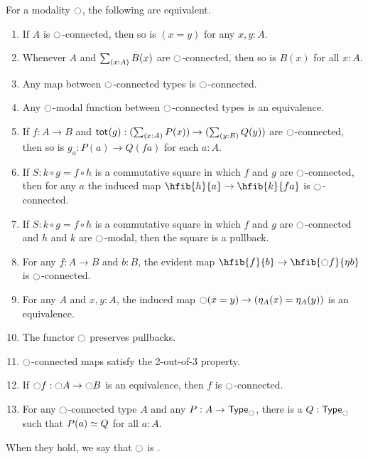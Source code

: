 \begin{thm}\label{thm:lex-modalities}
  For a modality $\modal$, the following are equivalent.
  \begin{enumerate}
  \item If $A$ is $\modal$-connected, then so is $(x=y)$ for any $x,y:A$.\label{item:mu0}
  \item Whenever $A$ and $\sm{x:A}B(x)$ are $\modal$-connected, then so is $B(x)$ for all $x:A$.\label{item:mu1}
  \item Any map between $\modal$-connected types is $\modal$-connected.\label{item:mu1a}
  \item Any $\modal$-modal function between $\modal$-connected types is an equivalence.\label{item:mu1b}
  \item If $f:A\to B$ and $\total g:(\sm{x:A} P(x)) \to (\sm{y:B} Q(y))$ are $\modal$-connected, then so is $g_a:P(a)\to Q(fa)$ for each $a:A$.\label{item:mu3b}
  \item If $S:k\circ g = f\circ h$ is a commutative square in which $f$ and $g$ are $\modal$-connected, then for any $a$ the induced map $\hfib{h}{a} \to \hfib{k}{fa}$ is $\modal$-connected.\label{item:mu3c}
  \item If $S:k\circ g = f\circ h$ is a commutative square in which $f$ and $g$ are $\modal$-connected and $h$ and $k$ are $\modal$-modal, then the square is a pullback.\label{item:mu3d}
  \item For any $f:A\to B$ and $b:B$, the evident map $\hfib{f}{b} \to \hfib{\modal f}{\modalunit b}$ is $\modal$-connected.\label{item:mu3a}
  \item For any $A$ and $x,y:A$, the induced map $\modal(x=y) \to (\modalunit[A](x) = \modalunit[A](y))$ is an equivalence.\label{item:mu6}
  \item The functor $\modal$ preserves pullbacks.\label{item:mu3}
  \item $\modal$-connected maps satisfy the 2-out-of-3 property.\label{item:mu4}
  \item If $\modal f: \modal A\to \modal B$ is an equivalence, then $f$ is $\modal$-connected.\label{item:mu5}
  \item For any $\modal$-connected type $A$ and any $P:A\to \modaltype$, there is a $Q:\modaltype$ such that $P(a)\eqvsym Q$ for all $a:A$.\label{item:mu2}
  \end{enumerate}
  When they hold, we say that $\modal$ is .
\end{thm}

